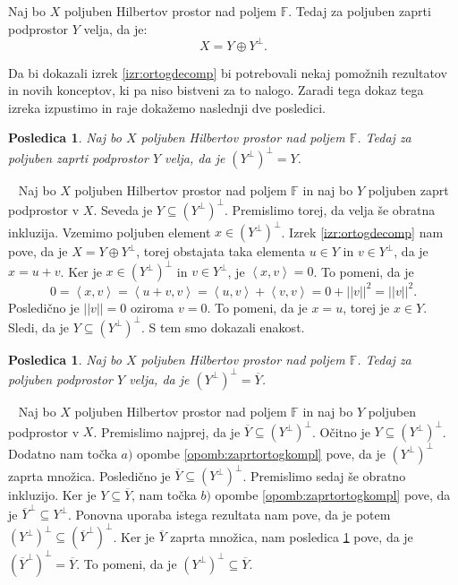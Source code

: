 \documentclass[12pt,a4paper,oneside,fleqn,openany]{book}
\newtheorem{posledica}[izrek]{Posledica}
\newcommand{\eopf}{\raisebox{0.8ex}{\framebox{}}} %
\newenvironment{dokaz}%
{\noindent{\bf Dokaz.}\ }%
{\hfill\eopf\par\bigskip}%
\newcommand{\F}{\mathbb{F}}
\newcommand{\abs}[1]{\ensuremath{\lvert #1 \rvert}}
\newcommand{\norm}[1]{\abs{\abs{#1}}}
\newcommand{\Sp}[2]{\ensuremath{\left<#1, #2\right>}}
\begin{document}
\begin{izrek}
	\label{izr:ortogdecomp}
	Naj bo $X$ poljuben Hilbertov prostor nad poljem $\F$. Tedaj za poljuben zaprti podprostor $Y$ velja, da je: $$X = Y \oplus Y^\bot.$$
\end{izrek}
Da bi dokazali izrek \ref{izr:ortogdecomp} bi potrebovali nekaj pomožnih rezultatov in novih konceptov, ki pa niso bistveni za to nalogo. Zaradi tega dokaz tega izreka izpustimo in raje dokažemo naslednji dve posledici.
\begin{posledica}
	\label{posl:zaportoggost}
	Naj bo $X$ poljuben Hilbertov prostor nad poljem $\F$. Tedaj za poljuben zaprti podprostor $Y$ velja, da je $(Y^{\bot})^\bot = Y$.
\end{posledica}
\begin{dokaz}
	Naj bo $X$ poljuben Hilbertov prostor nad poljem $\F$ in naj bo $Y$ poljuben zaprt podprostor v $X$. Seveda je $Y\subseteq (Y^\bot)^\bot$. Premislimo torej, da velja še obratna inkluzija. Vzemimo poljuben element $x\in (Y^\bot)^\bot$. Izrek \ref{izr:ortogdecomp} nam pove, da je $X = Y \oplus Y^\bot$, torej obstajata taka elementa $u\in Y$ in $v\in Y^\bot$, da je $x = u + v$. Ker je $x\in (Y^\bot)^\bot$ in $v\in Y^\bot$, je $\Sp{x}{v}=0$. To pomeni, da je $$0=\Sp{x}{v}=\Sp{u+v}{v}=\Sp{u}{v} + \Sp{v}{v} = 0 + \norm{v}^2 = \norm{v}^2.$$ Posledično je $\norm{v}=0$ oziroma $v=0$. To pomeni, da je $x = u$, torej je $x\in Y$. Sledi, da je $Y\subseteq(Y^\bot)^\bot$. S tem smo dokazali enakost.
\end{dokaz}
\begin{posledica}
	\label{posl:ortoggost}
	Naj bo $X$ poljuben Hilbertov prostor nad poljem $\F$. Tedaj za poljuben podprostor $Y$ velja, da je $(Y^\bot)^\bot = \overline{Y}$.
\end{posledica}
\begin{dokaz}
	Naj bo $X$ poljuben Hilbertov prostor nad poljem $\F$ in naj bo $Y$ poljuben podprostor v $X$. Premislimo najprej, da je $\overline{Y}\subseteq(Y^\bot)^\bot$. Očitno je $Y\subseteq(Y^\bot)^\bot$. Dodatno nam točka $a)$ opombe \ref{opomb:zaprtortogkompl} pove, da je $(Y^\bot)^\bot$ zaprta množica. Posledično je $\overline{Y}\subseteq (Y^\bot)^\bot$. Premislimo sedaj še obratno inkluzijo.
	Ker je $Y\subseteq\overline{Y}$, nam točka $b)$ opombe \ref{opomb:zaprtortogkompl} pove, da je $\overline{Y}^\bot \subseteq Y^\bot$. Ponovna uporaba istega rezultata nam pove, da je potem $(Y^\bot)^\bot\subseteq(\overline{Y}^\bot)^\bot$. Ker je $\overline{Y}$ zaprta množica, nam posledica \ref{posl:zaportoggost} pove, da je $(\overline{Y}^\bot)^\bot=\overline{Y}$. To pomeni, da je $(Y^\bot)^\bot\subseteq \overline{Y}$.
\end{dokaz}
\end{document}
